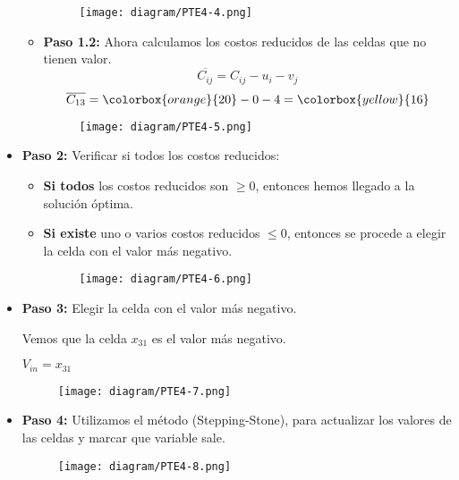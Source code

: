 \documentclass{templateNote}
\begin{document}
\begin{itemize}
\begin{itemize}
        \begin{figure}[H]
            \centering
            \texttt{[image: diagram/PTE4-4.png]}
        \end{figure}

        \item \textbf{Paso 1.2:} Ahora calculamos los costos reducidos de las celdas que no tienen valor.
        \begin{equation*}
            \overline{C_{ij}} = C_{ij} - u_i - v_j
        \end{equation*}
        \begin{equation*}
            \overline{C_{13}} = \colorbox{orange}{20} - 0 - 4 = \colorbox{yellow}{16}
        \end{equation*}
        \begin{figure}[H]
            \centering
            \texttt{[image: diagram/PTE4-5.png]}
        \end{figure}
    \end{itemize}

    \item \textbf{Paso 2:} Verificar si todos los costos reducidos:
    \begin{itemize}
        \item \textbf{Si todos} los costos reducidos son $\geq 0$, entonces hemos llegado a la solución óptima.
        
        \item \textbf{Si existe} uno o varios costos reducidos $\leq 0$, entonces se procede a elegir la celda con el valor más negativo.
        \begin{figure}[H]
            \centering
            \texttt{[image: diagram/PTE4-6.png]}
        \end{figure}
    \end{itemize}

    \item \textbf{Paso 3:} Elegir la celda con el valor más negativo.
    
    Vemos que la celda $x_{31}$ es el valor más negativo.
    \begin{center}
        $V_{in} = x_{31}$
    \end{center}

    \begin{figure}[H]
        \centering
        \texttt{[image: diagram/PTE4-7.png]}
    \end{figure}

    \item \textbf{Paso 4:} Utilizamos el método (Stepping-Stone), para actualizar los valores de las celdas y marcar que variable sale.
    \begin{figure}[H]
        \centering
        \texttt{[image: diagram/PTE4-8.png]}
    \end{figure}


\end{itemize}
\end{document}
